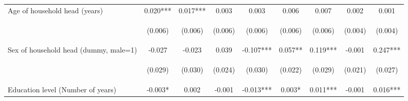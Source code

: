 \begin{center}
\begin{tabular}{lcccccccc}
Age of household head (years) & 0.020*** & 0.017*** & 0.003 & 0.003 & 0.006 & 0.007 & 0.002 & 0.001 \\
\vspace{4pt} & \begin{footnotesize}(0.006)\end{footnotesize} & \begin{footnotesize}(0.006)\end{footnotesize} & \begin{footnotesize}(0.006)\end{footnotesize} & \begin{footnotesize}(0.006)\end{footnotesize} & \begin{footnotesize}(0.006)\end{footnotesize} & \begin{footnotesize}(0.006)\end{footnotesize} & \begin{footnotesize}(0.004)\end{footnotesize} & \begin{footnotesize}(0.004)\end{footnotesize} \\
Sex of household head (dummy, male=1) & -0.027 & -0.023 & 0.039 & -0.107*** & 0.057** & 0.119*** & -0.001 & 0.247*** \\
\vspace{4pt} & \begin{footnotesize}(0.029)\end{footnotesize} & \begin{footnotesize}(0.030)\end{footnotesize} & \begin{footnotesize}(0.024)\end{footnotesize} & \begin{footnotesize}(0.030)\end{footnotesize} & \begin{footnotesize}(0.022)\end{footnotesize} & \begin{footnotesize}(0.029)\end{footnotesize} & \begin{footnotesize}(0.021)\end{footnotesize} & \begin{footnotesize}(0.027)\end{footnotesize} \\
Education level (Number of years) & -0.003* & 0.002 & -0.001 & -0.013*** & 0.003* & 0.011*** & -0.001 & 0.016*** \\

\end{tabular}
\end{center}
